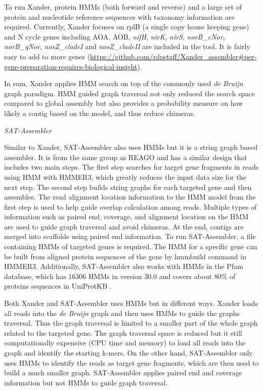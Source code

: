 \documentclass[]{msu-thesis}
\begin{document}
To run Xander, protein HMMs (both forward and reverse) and a large set
of protein and nucleotide reference sequences with taxonomy
information are required. Currently, Xander focuses on
rplB (a single copy
house keeping gene) and N cycle genes including AOA, AOB,
\textit{nifH}, \textit{nirK}, \textit{nirS}, \textit{norB\_cNor},
\textit{norB\_qNor}, \textit{nosZ\_cladeI} and \textit{nosZ\_cladeII}
are included in the tool. It is fairly easy to add to more genes
(\url{https://github.com/rdpstaff/Xander\_assembler\#per-gene-preparation-requires-biological-insight}).

In sum, Xander applies HMM search on top of the commonly used
\textit{de Bruijn} graph paradigm. HMM guided graph traversal not only
reduced the search space compared to global assembly but also provides
a probability measure on how likely a contig based on the model, and
thus reduce chimeras.

\textit{SAT-Assembler}

Similar to Xander, SAT-Assembler also uses HMMs but it is a string graph
based assembler. It is from the same group as REAGO and has a similar
design that includes two main steps. The first step searches for
target gene fragments in reads using HMM with HMMER3, which greatly
reduces the input data size for the next step. The second step builds
string graphs for each targeted gene and then assembles. The read
alignment location information to the HMM model from the first step is
used to help guide overlap calculation among reads. Multiple types of
information such as paired end, coverage, and alignment location on
the HMM are used to guide graph traversal and avoid chimeras. At the end,
contigs are merged into scaffolds using paired end information.  To
run SAT-Assembler, a file containing HMMs of targeted genes is
required. The HMM for a specific gene can be built from aligned
protein sequences of the gene by hmmbuild command in
HMMER3. Additionally, SAT-Assembler also works with HMMs in the Pfam
database, which has 16306 HMMs in version 30.0 and covers about 80\%
of proteins sequences in UniProtKB 
\cite{finn_pfam_2016}.

Both Xander and SAT-Assembler uses HMMs but in different ways. Xander
loads all reads into the \textit{de Bruijn} graph and then uses HMMs
to guide the graphs traversal. Thus the graph traversal is limited to
a smaller part of the whole graph related to the targeted gene. The graph
traversal space is reduced but it still computationally expensive (CPU
time and memory) to load all reads into the graph and identify the
starting k-mers.  On the other hand, SAT-Assembler
only uses HMMs to identify the reads as target gene fragments, which
are then used to build a much smaller graph.
SAT-Assembler applies paired end and coverage
information but not HMMs to guide graph traversal.
\end{document}
